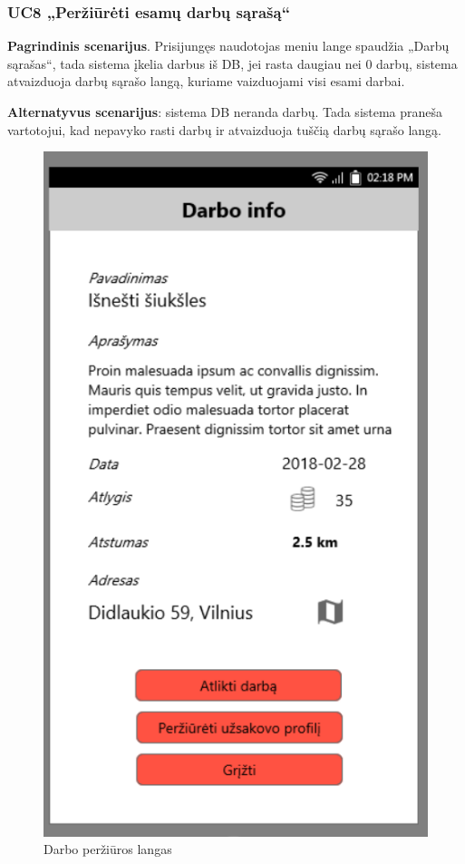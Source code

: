 \documentclass{VUMIFPSbakalaurinis}
\begin{document}
\subsubsection{UC8 „Peržiūrėti esamų darbų sąrašą“}
\textbf{Pagrindinis scenarijus}. Prisijungęs naudotojas meniu lange spaudžia „Darbų sąrašas“, tada sistema įkelia darbus iš DB, jei rasta daugiau nei 0 darbų, sistema atvaizduoja darbų sąrašo langą, kuriame vaizduojami visi esami darbai.
\par \textbf{Alternatyvus scenarijus}: sistema DB neranda darbų. Tada sistema praneša vartotojui, kad nepavyko rasti darbų ir atvaizduoja tuščią darbų sąrašo langą.

\begin{figure}[H]
	\centering
	\includegraphics[scale=0.4]{img/ScreenShots/6}
	\caption{Darbo peržiūros langas}
	\label{img:selected job 1}
\end{figure}
\end{document}
